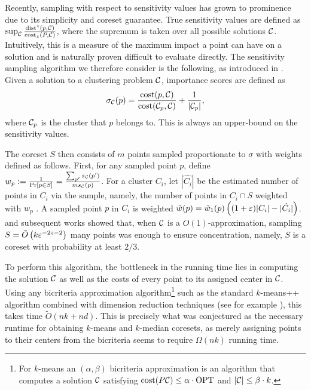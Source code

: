 Recently, sampling with respect to sensitivity values has grown to prominence due to its simplicity and coreset guarantee.  True sensitivity values are defined
as $\sup_{\mathcal C} \frac{\operatorname{dist}^z(p, \mathcal C)}{\operatorname{cost}_z(P, \mathcal C)}$, where the supremum is taken over all possible solutions $\mathcal C$. Intuitively, this is a measure
of the maximum impact a point can have on a solution and is naturally proven difficult to evaluate directly.
The sensitivity sampling algorithm we therefore consider is the following, as introduced in \cite{FeldmanL11}.
Given a solution to a clustering problem $\mathcal C$, importance scores are defined as
\begin{equation}
\label{eq:sensitivity}
\sigma_\mathcal C(p) = \dfrac{\operatorname{cost}(p, \mathcal C)}{\operatorname{cost}(\mathcal C_{p}, \mathcal C)} + \dfrac{1}{|\mathcal C_p|},
\end{equation}
where $\mathcal C_p$ is the cluster that $p$ belongs to. This is always an upper-bound on the sensitivity values.

The coreset $S$ then consists of $m$ points sampled proportionate to $\sigma$ with weights defined as follows. First, for any sampled point $p$, define $w_p :=
\frac{1}{\Pr[p \in S]} = \frac{\sum_{p'} s_\mathcal C(p')}{m s_\mathcal C(p)}$. For a cluster $C_i$, let $|\hat{C_i}|$ be the estimated number of points in $C_i$ via the
sample, namely, the number of points in $C_i \cap S$ weighted with $w_p$ . A sampled point $p$ in $C_i$ is weighted $\tilde w(p) = \tilde w_1(p) \left( (1+\varepsilon)|C_i|
- |\hat{C_i}|\right)$.  \cite{FeldmanL11} and subsequent works showed that, when $\mathcal C$ is a $O(1)$-approximation, sampling $S = \tilde O\left(
k \varepsilon^{-2z-2}\right)$ many points was enough to ensure concentration, namely, $S$ is a coreset with probability at least $2/3$.

To perform this algorithm, the bottleneck in the running time lies in computing the solution $\mathcal C$ as well as the costs of every point to its assigned
center in $\mathcal C$. Using any bicriteria approximation algorithm\footnote{For $k$-means an $(\alpha,\beta)$ bicriteria approximation is an algorithm that
computes a solution $\mathcal C$ satisfying $\operatorname{cost}(P\mathcal C)\leq \alpha\cdot \text{OPT}$ and $|\mathcal C|\leq \beta\cdot k$.} such as the standard $k$-means++ algorithm
\cite{ArV07} combined with dimension reduction techniques (see for example \cite{BecchettiBC0S19,CohenEMMP15,MakarychevMR19}), this takes time $\tilde O(nk
+nd)$. This is precisely what was conjectured as the necessary runtime for obtaining $k$-means and $k$-median coresets, as merely assigning points to their centers from the bicriteria seems to require $\Omega(nk)$ running time.

